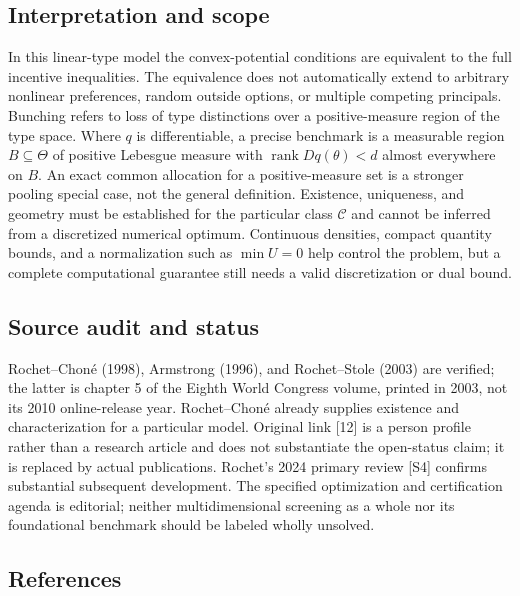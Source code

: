 \documentclass[11pt,a4paper]{article}
\begin{document}
\subsection*{Interpretation and scope}

In this linear-type model the convex-potential conditions are equivalent to the full incentive inequalities. The equivalence does not automatically extend to arbitrary nonlinear preferences, random outside options, or multiple competing principals. Bunching refers to loss of type distinctions over a positive-measure region of the type space. Where $q$ is differentiable, a precise benchmark is a measurable region $B\subseteq\Theta$ of positive Lebesgue measure with $\operatorname{rank}Dq(\theta)<d$ almost everywhere on $B$. An exact common allocation for a positive-measure set is a stronger pooling special case, not the general definition. Existence, uniqueness, and geometry must be established for the particular class $\mathcal C$ and cannot be inferred from a discretized numerical optimum. Continuous densities, compact quantity bounds, and a normalization such as $\min U=0$ help control the problem, but a complete computational guarantee still needs a valid discretization or dual bound.

\subsection*{Source audit and status}

Rochet--Choné (1998), Armstrong (1996), and Rochet--Stole (2003) are verified; the latter is chapter 5 of the Eighth World Congress volume, printed in 2003, not its 2010 online-release year. Rochet--Choné already supplies existence and characterization for a particular model. Original link [12] is a person profile rather than a research article and does not substantiate the open-status claim; it is replaced by actual publications. Rochet's 2024 primary review [S4] confirms substantial subsequent development. The specified optimization and certification agenda is editorial; neither multidimensional screening as a whole nor its foundational benchmark should be labeled wholly unsolved.

\subsection*{References}
\end{document}
